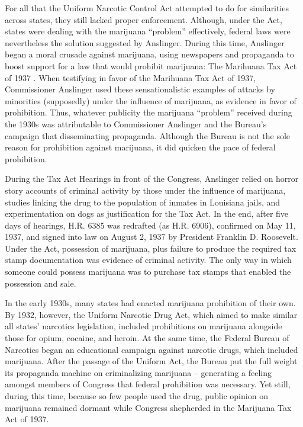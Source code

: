 For all that the Uniform Narcotic Control Act attempted to do for similarities across states, they still lacked proper enforcement. Although, under the Act, states were dealing with the marijuana ``problem'' effectively, federal laws were nevertheless the solution suggested by Anslinger. During this time, Anslinger began a moral crusade against marijuana, using newspapers and propaganda to boost support for a law that would prohibit marijuana: The Marihuana Tax Act of 1937 \citep{king_1953,anslinger_1932}. When testifying in favor of the Marihuana Tax Act of 1937, Commissioner Anslinger used these sensationalistic examples of attacks by minorities (supposedly) under the influence of marijuana, as evidence in favor of prohibition. Thus, whatever publicity the marijuana ``problem'' received during the 1930s was attributable to Commissioner Anslinger and the Bureau's campaign that disseminating propaganda. Although the Bureau is not the sole reason for prohibition against marijuana, it did quicken the pace of federal prohibition. 

During the Tax Act Hearings \citep{tax_1937} in front of the  Congress, Anslinger relied on horror story accounts of criminal activity by those under the influence of marijuana, studies linking the drug to the population of inmates in Louisiana jails, and experimentation on dogs as justification for the Tax Act. In the end, after five days of hearings, H.R. 6385 was redrafted (as H.R. 6906), confirmed on May 11, 1937, and signed into law on August 2, 1937 by President Franklin D. Roosevelt. Under the Act, possession of marijuana, plus failure to produce the required tax stamp documentation was evidence of criminal activity. The only way in which someone could possess marijuana was to purchase tax stamps that enabled the possession and sale. 

In the early 1930s, many states had enacted marijuana prohibition of their own. By 1932, however, the Uniform Narcotic Drug Act, which aimed to make similar all states' narcotics legislation, included prohibitions on marijuana alongside those for opium, cocaine, and heroin. At the same time, the Federal Bureau of Narcotics began an educational campaign against narcotic drugs, which included marijuana. After the passage of the Uniform Act, the Bureau put the full weight its propaganda machine on criminalizing marijuana -- generating a feeling amongst members of Congress that federal prohibition was necessary. Yet still, during this time, because so few people used the drug, public opinion on marijuana remained dormant while Congress shepherded in the Marijuana Tax Act of 1937. 

